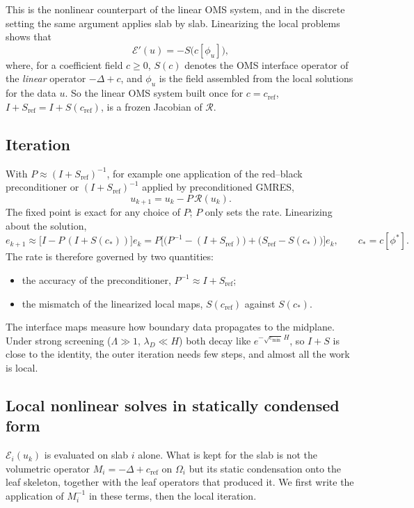 \documentclass[11pt,a4paper]{article}
\theoremstyle{remark}\newtheorem{remark}{Remark}
\newcommand{\cR}{c_{\mathrm{ref}}}
\begin{document}
This is the nonlinear counterpart of the linear OMS system, and in the
discrete setting the same argument applies slab by slab. Linearizing the local problems shows that
\begin{equation}
  \mathcal E'(u)=-S\big(c[\phi_u]\big),
\end{equation}
where, for a coefficient field $c\ge0$, $S(c)$ denotes the OMS interface
operator of the \emph{linear} operator $-\Delta+c$, and $\phi_u$ is the field
assembled from the local solutions for the data $u$. So the
linear OMS system built once for $c=\cR$, $I+S_{\mathrm{ref}}=I+S(\cR)$, is a
frozen Jacobian of $\mathcal R$.

\subsection{Iteration}
With $P\approx(I+S_{\mathrm{ref}})^{-1}$, for example one application of the
red--black preconditioner or $(I+S_{\mathrm{ref}})^{-1}$ applied by
preconditioned GMRES,
\begin{equation}\label{eq:ichord}
  \boxed{\;u_{k+1}=u_k-P\,\mathcal R(u_k).\;}
\end{equation}
The fixed point is exact for any choice of $P$; $P$ only sets the rate.
Linearizing about the solution,
\begin{equation}\label{eq:irate}
  e_{k+1}\approx\big[I-P\,(I+S(c_*))\big]e_k
  =P\Big[\big(P^{-1}-(I+S_{\mathrm{ref}})\big)+\big(S_{\mathrm{ref}}-S(c_*)\big)\Big]e_k,
  \qquad c_*=c[\phi^*].
\end{equation}
The rate is therefore governed by two quantities:
\begin{itemize}
  \item the accuracy of the preconditioner, $P^{-1}\approx I+S_{\mathrm{ref}}$;
  \item the mismatch of the linearized local maps, $S(\cR)$ against $S(c_*)$.
\end{itemize}
The interface maps measure how boundary data propagates to the midplane.
Under strong screening ($\Lambda\gg1$, $\lambda_D\ll H$) both decay like
$e^{-\sqrt{c_{\min}}\,H}$, so $I+S$ is close to the identity, the outer
iteration needs few steps, and almost all the work is local.

\subsection{Local nonlinear solves in statically condensed form}\label{sec:local}
$\mathcal E_i(u_k)$ is evaluated on slab $i$ alone. What is kept for the slab
is not the volumetric operator $M_i=-\Delta+\cR$ on $\Omega_i$ but its static
condensation onto the leaf skeleton, together with the leaf operators that
produced it. We first write the application of $M_i^{-1}$ in these terms, then
the local iteration.
\end{document}
